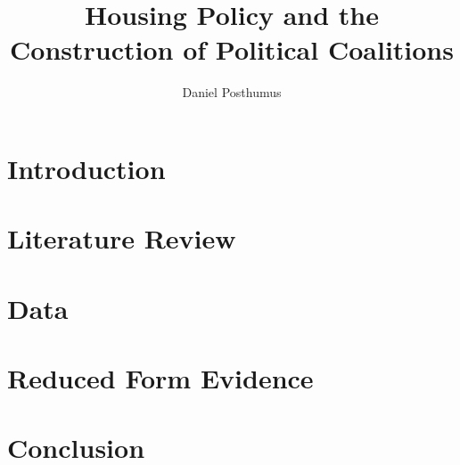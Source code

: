 \documentclass{article}
\begin{document}
\title{Housing Policy and the Construction of Political Coalitions} 
\author{Daniel Posthumus}

\maketitle

\section{Introduction}



\section{Literature Review}



\section{Data}



\section{Reduced Form Evidence}



\section{Conclusion}



\nocite{*}

\printbibliography
\end{document}
